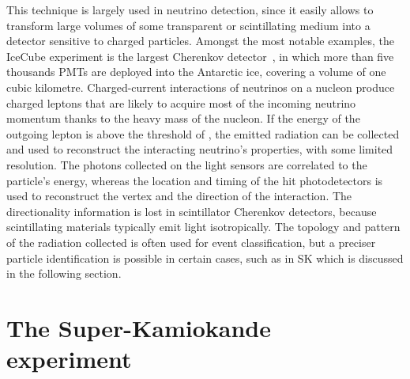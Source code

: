 This technique is largely used in neutrino detection, since it easily allows %
to transform large volumes of some transparent or scintillating medium into a detector sensitive to charged particles.
Amongst the most notable examples, the IceCube experiment is the largest Cherenkov detector~\cite{Abbasi:2008aa}, %
in which more than five thousands PMTs are deployed into the Antarctic ice, covering a volume of one cubic kilometre.
Charged-current interactions of neutrinos on a nucleon produce charged leptons %
that are likely to acquire most of the incoming neutrino momentum thanks to the heavy mass of the nucleon.
If the energy of the outgoing lepton is above the threshold of , %
the emitted radiation can be collected and used to reconstruct the interacting neutrino's properties, with some limited resolution.
The photons collected on the light sensors are correlated to the particle's energy, %
whereas the location and timing of the hit photodetectors is used to reconstruct the vertex %
and the direction of the interaction.
The directionality information is lost in scintillator Cherenkov detectors, because %
scintillating materials typically emit light isotropically.
The topology and pattern of the radiation collected is often used for event classification, %
but a preciser particle identification is possible in certain cases, such as in SK which is discussed in the following section.



\section{The Super-Kamiokande experiment}
\label{sec:sk}

